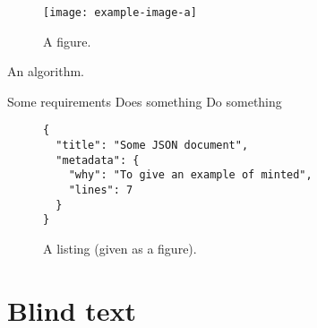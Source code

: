\documentclass[
  b5paper,
  fontsize = 11pt,
  english,
  openany,
  twoside=false,
  roman equations,
]{thesis}
\begin{document}
  \begin{figure}
    \texttt{[image: example-image-a]}
    \caption{A figure.}
  \end{figure}

  \begin{algorithm}
    \caption{An algorithm.}
    \begin{algorithmic}[1]
      \Require Some requirements
      \Ensure Does something
      \Statex
        \State Do something
      \EndWhile
      \State {}
    \end{algorithmic}
  \end{algorithm}

  \begin{figure}
    \begin{verbatim}
{
  "title": "Some JSON document",
  "metadata": {
    "why": "To give an example of minted",
    "lines": 7
  }
}
    \end{verbatim}
    \caption{A listing (given as a figure).}
  \end{figure}

  \part{Blind text}

  \Blinddocument

  \backmatter

  \Blinddocument

  \printbibliography

  \printindex\label{index}

  \glsaddall[types={notations}]
  \printglossary[
    type=notations,
    style=long-symbol,
    nonumberlist,
  ]
\end{document}
